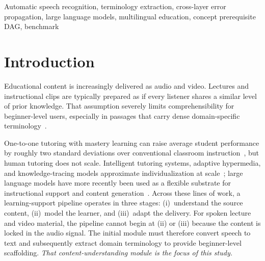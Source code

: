\documentclass[conference]{IEEEtran}
\begin{document}
\begin{abstract}
the local 4-bit run on the same clips, while DeepSeek~V4.1 Flash at $27.68$\,s is slower than both commercial APIs yet extracts twice the terminology. We report single-annotator (\texttt{A1}) human coverage ($233$ pilot + $180$ recovered candidate items, distinguishing $59$ direct CSV exports; $55$ EN pending; no double-blind human IAA is claimed) alongside persisted automated judge audits including a cross-family comparison (`Qwen2.5-7B` over $184$ clean non-fallback verdicts vs.\ `Mistral-7B-v0.3` over $454$ verdicts, excluding $270$ parse fallbacks). Measured readability ($807$ explanations scored with Ate\c{s}man for Turkish and Flesch for English) places only $18$--$45\%$ of individual explanations inside the target B1 band, and reference-definition similarity is reported as a \emph{lexical proxy} rather than contextual-embedding BERTScore because the optional \texttt{bert\_score} package is absent from the experiment environment. An enriched downstream educational schema featuring Bloom taxonomy levels and concept prerequisite directed acyclic graphs (DAGs) completes the pipeline.
\end{abstract}

\begin{IEEEkeywords}
Automatic speech recognition, terminology extraction, cross-layer error propagation, large language models, multilingual education, concept prerequisite DAG, benchmark
\end{IEEEkeywords}

\section{Introduction}

Educational content is increasingly delivered as audio and video. Lectures and instructional clips are typically prepared as if every listener shares a similar level of prior knowledge. That assumption severely limits comprehensibility for beginner-level users, especially in passages that carry dense domain-specific terminology~\cite{conde2016,xu2024}.

One-to-one tutoring with mastery learning can raise average student performance by roughly two standard deviations over conventional classroom instruction~\cite{bloom1984}, but human tutoring does not scale. Intelligent tutoring systems, adaptive hypermedia, and knowledge-tracing models approximate individualization at scale~\cite{brusilovsky2007,corbett1995,vanlehn2011}; large language models have more recently been used as a flexible substrate for instructional support and content generation~\cite{xu2024,vanzo2025}. Across these lines of work, a learning-support pipeline operates in three stages: (i)~understand the source content, (ii)~model the learner, and (iii)~adapt the delivery. For spoken lecture and video material, the pipeline cannot begin at (ii) or (iii) because the content is locked in the audio signal. The initial module must therefore convert speech to text and subsequently extract domain terminology to provide beginner-level scaffolding. \emph{That content-understanding module is the focus of this study.}
\end{document}
